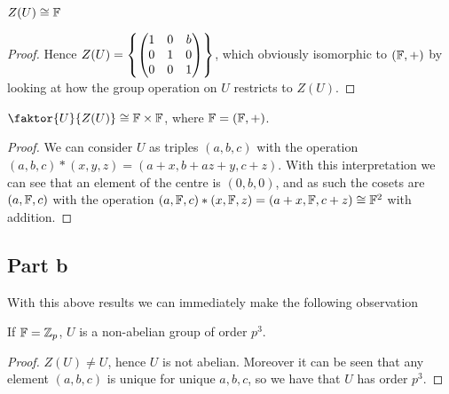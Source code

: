 \documentclass{article}
\begin{document}
\begin{prop}
$Z(U) \cong \mathbb{F}$
\end{prop}
\begin{proof}
Hence $Z(U) = \left\{ \begin{pmatrix}1 & 0 & b \\ 0 & 1 & 0 \\ 0 & 0 & 1 \end{pmatrix} \right\}$, which obviously isomorphic to $(\mathbb{F},+)$ by looking at how the group operation on $U$ restricts to $Z(U)$. 
\end{proof}

\begin{prop}
$\faktor{U}{Z(U)} \cong \mbb{F} \times \mbb{F}$, where $\mathbb{F} = ( \mathbb{F},+)$.
\end{prop}
\begin{proof}
We can consider $U$ as triples $(a,b,c)$ with the operation $(a,b,c)\ast(x,y,z) = (a+x,b+ az+y,c+z)$. With this interpretation we can see that an element of the centre is $(0,b,0)$, and as such the cosets are $(a,\mathbb{F},c)$ with the operation $(a,\mathbb{F},c)\ast(x,\mathbb{F},z) = (a+x,\mathbb{F},c+z)\cong \mathbb{F}^2$ with addition. 
\end{proof}

\subsection{Part b}
With this above results we can immediately make the following observation

\begin{theorem}
If $\mathbb{F} = \mathbb{Z}_p$, $U$ is a non-abelian group of order $p^3$. 
\end{theorem}
\begin{proof}
$Z(U) \neq U$, hence $U$ is not abelian. Moreover it can be seen that any element $(a,b,c)$ is unique for unique $a,b,c$, so we have that $U$ has order $p^3$. 
\end{proof}
\end{document}
